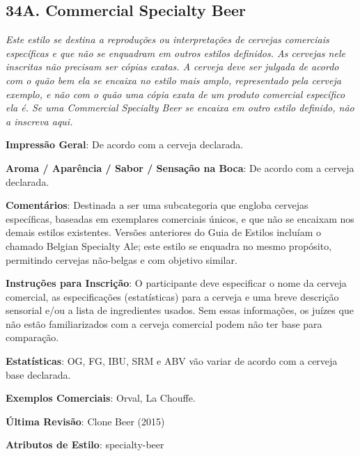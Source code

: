 \subsection*{34A. Commercial Specialty Beer}

\textit{Este estilo se destina a reproduções ou interpretações de cervejas comerciais específicas e que não se enquadram em outros estilos definidos. As cervejas nele inscritas não precisam ser cópias exatas. A cerveja deve ser julgada de acordo com o quão bem ela se encaixa no estilo mais amplo, representado pela cerveja exemplo, e não com o quão uma cópia exata de um produto comercial específico ela é. Se uma Commercial Specialty Beer se encaixa em outro estilo definido, não a inscreva aqui.}

\textbf{Impressão Geral}: De acordo com a cerveja declarada.

\textbf{Aroma / Aparência / Sabor / Sensação na Boca}: De acordo com a cerveja declarada.

\textbf{Comentários}: Destinada a ser uma subcategoria que engloba cervejas específicas, baseadas em exemplares comerciais únicos, e que não se encaixam nos demais estilos existentes. Versões anteriores do Guia de Estilos incluíam o chamado Belgian Specialty Ale; este estilo se enquadra no mesmo propósito, permitindo cervejas não-belgas e com objetivo similar.

\textbf{Instruções para Inscrição}: O participante deve especificar o nome da cerveja comercial, as especificações (estatísticas) para a cerveja e uma breve descrição sensorial e/ou a lista de ingredientes usados. Sem essas informações, os juízes que não estão familiarizados com a cerveja comercial podem não ter base para comparação.

\textbf{Estatísticas}: OG, FG, IBU, SRM e ABV vão variar de acordo com a cerveja base declarada.

\textbf{Exemplos Comerciais}: Orval, La Chouffe.

\textbf{Última Revisão}: Clone Beer (2015)

\textbf{Atributos de Estilo}: specialty-beer


